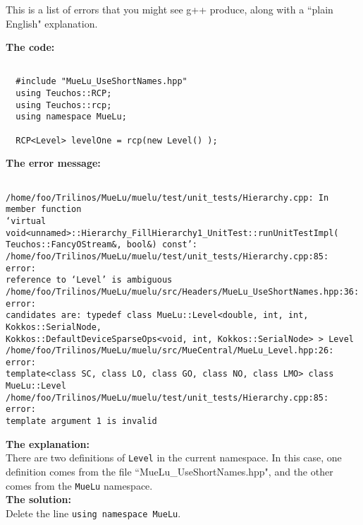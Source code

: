 This is a list of errors that you might see g++ produce, along with a ``plain English" explanation.

\be
\item {\bf The code:}
\begin{verbatim}

  #include "MueLu_UseShortNames.hpp"
  using Teuchos::RCP;
  using Teuchos::rcp;
  using namespace MueLu;

  RCP<Level> levelOne = rcp(new Level() );
\end{verbatim}
{\bf The error message:}
\begin{verbatim}

/home/foo/Trilinos/MueLu/muelu/test/unit_tests/Hierarchy.cpp: In member function
‘virtual void<unnamed>::Hierarchy_FillHierarchy1_UnitTest::runUnitTestImpl(
Teuchos::FancyOStream&, bool&) const’:
/home/foo/Trilinos/MueLu/muelu/test/unit_tests/Hierarchy.cpp:85: error:
reference to ‘Level’ is ambiguous
/home/foo/Trilinos/MueLu/muelu/src/Headers/MueLu_UseShortNames.hpp:36: error:
candidates are: typedef class MueLu::Level<double, int, int, Kokkos::SerialNode,
Kokkos::DefaultDeviceSparseOps<void, int, Kokkos::SerialNode> > Level
/home/foo/Trilinos/MueLu/muelu/src/MueCentral/MueLu_Level.hpp:26: error:
template<class SC, class LO, class GO, class NO, class LMO> class MueLu::Level
/home/foo/Trilinos/MueLu/muelu/test/unit_tests/Hierarchy.cpp:85: error:
template argument 1 is invalid
\end{verbatim}
{\bf The explanation:}\\
There are two definitions of \verb!Level! in the current namespace.  In this case, one definition comes from the
file ``MueLu\_UseShortNames.hpp", and the other comes from the \verb!MueLu! namespace.\\
{\bf The solution:}\\
Delete the line \verb!using namespace MueLu!.
\ee
